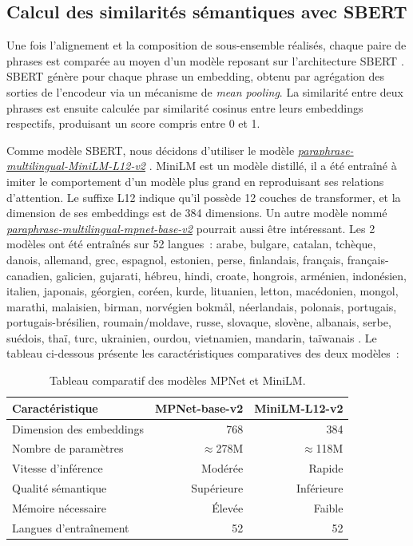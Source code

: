 \subsection{Calcul des similarités sémantiques avec SBERT}

Une fois l’alignement et la composition de sous-ensemble réalisés, chaque paire de phrases est comparée au moyen d’un modèle reposant sur
l’architecture SBERT \citep{reimers_2019}. SBERT génère pour chaque phrase un embedding, obtenu
par agrégation des sorties de l'encodeur via un mécanisme de \textit{mean pooling}. La similarité entre
deux phrases est ensuite calculée par similarité cosinus entre leurs embeddings respectifs,
produisant un score compris entre 0 et 1.

Comme modèle SBERT, nous décidons d'utiliser le modèle 
\href{https://huggingface.co/sentence-transformers/paraphrase-multilingual-MiniLM-L12-v2}{\textit{paraphrase-multilingual-MiniLM-L12-v2}} \citep{reimers_2019}.
MiniLM est un modèle distillé, il a été entraîné à imiter le comportement d'un modèle plus grand en 
reproduisant ses relations d'attention. Le suffixe L12 indique qu'il possède 12 couches de
transformer, et la dimension de ses embeddings est de 384 dimensions. Un autre modèle nommé 
\href{https://huggingface.co/sentence-transformers/paraphrase-multilingual-mpnet-base-v2}{\textit{paraphrase-multilingual-mpnet-base-v2}} \citep{reimers_2019}
pourrait aussi être intéressant. Les 2 modèles ont été entraînés sur 52 langues~: arabe, bulgare, 
catalan, tchèque, danois, allemand, grec, espagnol, estonien, perse, finlandais, français, français-canadien, galicien, gujarati, hébreu,
hindi, croate, hongrois, arménien, indonésien, italien, japonais, géorgien, coréen, kurde, lituanien, letton, macédonien, mongol, marathi, malaisien, birman,
norvégien bokm{\aa}l, néerlandais, polonais, portugais, portugais-brésilien, roumain/moldave, russe, slovaque, slovène, albanais, serbe, suédois,
thaï, turc, ukrainien, ourdou, vietnamien, mandarin, taïwanais \citep{reimers_2020}.
Le tableau ci-dessous présente les caractéristiques comparatives des deux modèles~:

\begin{table}[H]
\centering
\begin{tabular}{lrr}
\hline
\textbf{Caractéristique} & \textbf{MPNet-base-v2} & \textbf{MiniLM-L12-v2} \\
\hline
Dimension des embeddings & \multicolumn{1}{S}{768} & \multicolumn{1}{S}{384} \\
Nombre de paramètres & $\approx$278M & $\approx$118M \\
Vitesse d'inférence & Modérée & Rapide \\
Qualité sémantique & Supérieure & Inférieure \\
Mémoire nécessaire & Élevée & Faible \\
Langues d'entraînement & \multicolumn{1}{S}{52} & \multicolumn{1}{S}{52} \\
\hline
\end{tabular}
\caption{Tableau comparatif des modèles MPNet et MiniLM.}
\end{table}

